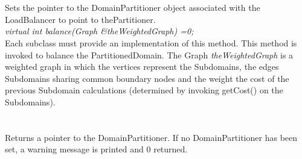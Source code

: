  \\
 \\
Sets the pointer to the DomainPartitioner object associated with the
LoadBalancer to point to \p thePartitioner. \\

{\em virtual int balance(Graph \&theWeightedGraph) =0;} \\ 
Each subclass must provide an implementation of this method. This
method is invoked to balance the PartitionedDomain. The Graph {\em
theWeightedGraph} is a weighted graph in which the vertices represent
the Subdomains, the edges Subdomains sharing common boundary nodes and
the weight the cost of the previous Subdomain calculations (determined
by invoking getCost() on the Subdomains). \\


  \\
\\
Returns a pointer to the DomainPartitioner. If no DomainPartitioner
has been set, a warning message is printed and $0$ returned. \\




